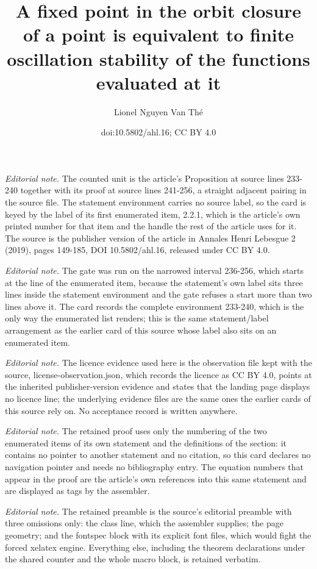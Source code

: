 \documentclass[10pt,a4paper]{article}
\title{A fixed point in the orbit closure of a point is equivalent to finite oscillation stability of the functions evaluated at it}
\author{Lionel Nguyen Van Thé}
\date{doi:10.5802/ahl.16; CC BY 4.0}
\theoremstyle{definition}
\numberwithin{equation}{section}
\numberwithin{figure}{section}
\numberwithin{table}{section}
\begin{document}
\maketitle
\setcounter{section}{2}
\setcounter{enumi}{1}
\setcounter{equation}{10}
\noindent\textit{Editorial note.} The counted unit is the article's Proposition at source lines 233-240 together with its proof at source lines 241-256, a straight adjacent pairing in the source file. The statement environment carries no source label, so the card is keyed by the label of its first enumerated item, 2.2.1, which is the article's own printed number for that item and the handle the rest of the article uses for it. The source is the publisher version of the article in Annales Henri Lebesgue 2 (2019), pages 149-185, DOI 10.5802/ahl.16, released under CC BY 4.0.\par\medskip
\noindent\textit{Editorial note.} The gate was run on the narrowed interval 236-256, which starts at the line of the enumerated item, because the statement's own label sits three lines inside the statement environment and the gate refuses a start more than two lines above it. The card records the complete environment 233-240, which is the only way the enumerated list renders; this is the same statement/label arrangement as the earlier card of this source whose label also sits on an enumerated item.\par\medskip
\noindent\textit{Editorial note.} The licence evidence used here is the observation file kept with the source, license-observation.json, which records the licence as CC BY 4.0, points at the inherited publisher-version evidence and states that the landing page displays no licence line; the underlying evidence files are the same ones the earlier cards of this source rely on. No acceptance record is written anywhere.\par\medskip
\noindent\textit{Editorial note.} The retained proof uses only the numbering of the two enumerated items of its own statement and the definitions of the section: it contains no pointer to another statement and no citation, so this card declares no navigation pointer and needs no bibliography entry. The equation numbers that appear in the proof are the article's own references into this same statement and are displayed as tags by the assembler.\par\medskip
\noindent\textit{Editorial note.} The retained preamble is the source's editorial preamble with three omissions only: the class line, which the assembler supplies; the page geometry; and the fontspec block with its explicit font files, which would fight the forced xelatex engine. Everything else, including the theorem declarations under the shared counter and the whole macro block, is retained verbatim.\par\medskip
\end{document}
